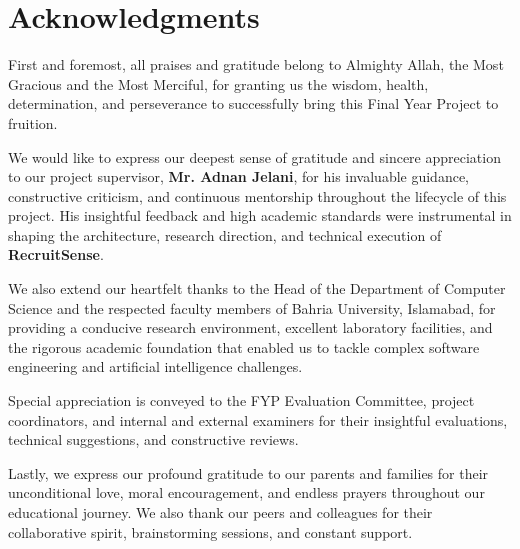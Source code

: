 \chapter*{Acknowledgments}

First and foremost, all praises and gratitude belong to Almighty Allah, the Most Gracious and the Most Merciful, for granting us the wisdom, health, determination, and perseverance to successfully bring this Final Year Project to fruition.

We would like to express our deepest sense of gratitude and sincere appreciation to our project supervisor, \textbf{Mr. Adnan Jelani}, for his invaluable guidance, constructive criticism, and continuous mentorship throughout the lifecycle of this project. His insightful feedback and high academic standards were instrumental in shaping the architecture, research direction, and technical execution of \textbf{RecruitSense}.

We also extend our heartfelt thanks to the Head of the Department of Computer Science and the respected faculty members of Bahria University, Islamabad, for providing a conducive research environment, excellent laboratory facilities, and the rigorous academic foundation that enabled us to tackle complex software engineering and artificial intelligence challenges.

Special appreciation is conveyed to the FYP Evaluation Committee, project coordinators, and internal and external examiners for their insightful evaluations, technical suggestions, and constructive reviews.

Lastly, we express our profound gratitude to our parents and families for their unconditional love, moral encouragement, and endless prayers throughout our educational journey. We also thank our peers and colleagues for their collaborative spirit, brainstorming sessions, and constant support.

\vspace{12mm}


\vspace{4mm}
\flushleft{\today}
